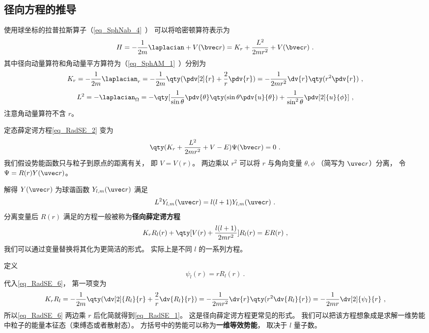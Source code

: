 \subsection{径向方程的推导}
使用球坐标的拉普拉斯算子（\autoref{eq_SphNab_4}~） 可以将哈密顿算符表示为
\begin{equation}\label{eq_RYTDSE_2}
H = -\frac{1}{2m} \laplacian + V(\bvec r) =  K_r + \frac{L^2}{2mr^2} + V(\bvec r)~.
\end{equation}
其中径向动量算符和角动量平方算符为（\autoref{eq_SphAM_1}~）分别为
\begin{equation}
K_r =-\frac{1}{2m} \laplacian_r =  - \frac{1}{2m} \qty(\pdv[2]{r} + \frac2r \pdv{r}) = -\frac{1}{2mr^2} \dv{r} \qty(r^2\pdv{r})~,
\end{equation}
\begin{equation}\label{eq_RadSE_3}
L^2 = -\laplacian_\Omega = -\qty[ \frac{1}{\sin\theta} \pdv{\theta} \qty(\sin \theta \pdv{u}{\theta}) + \frac{1}{\sin^2 \theta} \pdv[2]{u}{\phi}]~,
\end{equation}
注意角动量算符不含 $r$。

定态薛定谔方程\autoref{eq_RadSE_2} 变为
\begin{equation}
\qty(K_r + \frac{L^2}{2mr^2} + V - E)\Psi(\bvec r) = 0~.
\end{equation}
我们假设势能函数只与粒子到原点的距离有关， 即 $V = V(r)$。 两边乘以 $r^2$ 可以将 $r$ 与角向变量 $\theta, \phi$ （简写为 $\uvec r$）分离， 令 $\Psi = R(r)Y(\uvec r)$。

解得 $Y(\uvec r)$ 为球谐函数 $Y_{l,m}(\uvec r)$ 满足
\begin{equation}
L^2 Y_{l,m}(\uvec r) = l(l+1) Y_{l,m}(\uvec r)~.
\end{equation}
分离变量后 $R(r)$ 满足的方程一般被称为\textbf{径向薛定谔方程}
\begin{equation}\label{eq_RadSE_6}
K_r R_l(r) + \qty[V(r) + \frac{l(l+1)}{2mr^2} ]R_l(r) = ER(r)~,
\end{equation}
我们可以通过变量替换将其化为更简洁的形式。 实际上是不同 $l$ 的一系列方程。

定义
\begin{equation}
\psi_l(r) = r R_l(r)~.
\end{equation}
代入\autoref{eq_RadSE_6}， 第一项变为
\begin{equation}
K_r R_l =  - \frac{1}{2m} \qty(\dv[2]{R_l}{r} + \frac2r \dv{R_l}{r}) = -\frac{1}{2mr^2} \dv{r} \qty(r^2\dv{R_l}{r}) =  -\frac{1}{2mr} \dv[2]{\psi_l}{r}~,
\end{equation}
所以\autoref{eq_RadSE_6} 两边乘 $r$ 后化简就得到\autoref{eq_RadSE_1}。 这是径向薛定谔方程更常见的形式。 我们可以把该方程想象成是求解一维势能中粒子的能量本征态（束缚态或者散射态）。 方括号中的势能可以称为\textbf{一维等效势能}， 取决于 $l$ 量子数。

